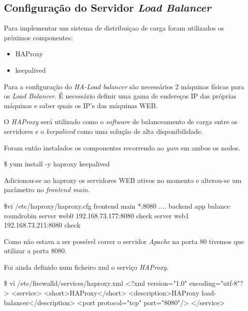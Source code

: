 \subsection{Configuração do Servidor \textit{Load Balancer}}

Para implementar um sistema de distribuiçao de carga foram utilizados os próximos componentes:

\begin{itemize}
  \item HAProxy
  \item keepalived
\end{itemize}

Para a configuração do \textit{HA-Load balancer} são necessários 2 máquinas físicas para os \textit{Load Balancer}. É necessário definir uma gama de endereços IP das próprias máquinas e saber quais os IP's das máquinas WEB.

O \textit{HAProxy} será utilizado como o \textit{software} de balanceamento de carga entre os servidores e o \textit{keepalived} como uma solução de alta disponibilidade.

Foram então instalados os componentes recorrendo ao \textit{yum} em ambos os nodos.

\begin{MyVerbatims}
  \$ yum install -y haproxy keepalived
\end{MyVerbatims}

Adicionou-se ao haproxy os servidores WEB ativos no momento e alterou-se um parâmetro no \textit{frontend main}.

\begin{MyVerbatims}
  \$vi /etc/haproxy/haproxy.cfg
    frontend  main *:8080
    ....
    backend app
      balance     roundrobin
      server  web0 192.168.73.177:8080 check
      server  web1 192.168.73.211:8080 check
\end{MyVerbatims}

Como não estava a ser possível correr o servidor \textit{Apache} na porta 80 tivemos que utilizar a porta 8080.

Foi ainda definido num ficheiro xml o serviço \textit{HAProxy}.

\begin{MyVerbatims}
  \$ vi /etc/firewalld/services/haproxy.xml
    <?xml version="1.0" encoding="utf-8"?>
    <service>
      <short>HAProxy</short>
      <description>HAProxy load-balancer</description>
      <port protocol="tcp" port="8080"/>
    </service>
\end{MyVerbatims}

